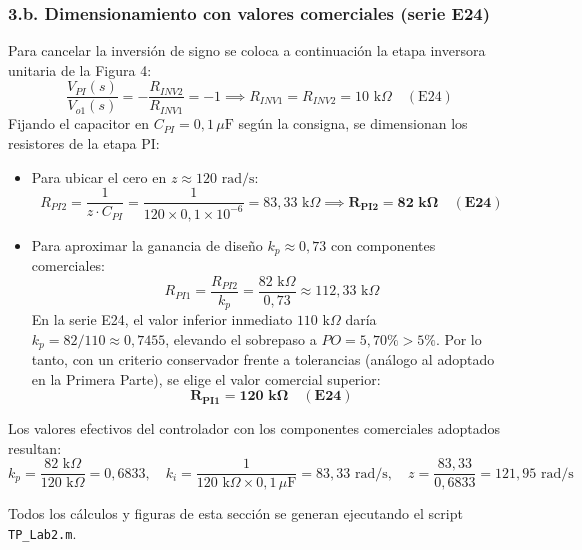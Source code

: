 \documentclass[11pt,a4paper]{article}
\begin{document}
\subsubsection*{3.b. Dimensionamiento con valores comerciales (serie E24)}
Para cancelar la inversión de signo se coloca a continuación la etapa inversora unitaria de la Figura 4:
\begin{equation}
    \frac{V_{PI}(s)}{V_{o1}(s)} = -\frac{R_{INV2}}{R_{INV1}} = -1 \implies R_{INV1} = R_{INV2} = 10\text{ k}\Omega \quad (\text{E24})
\end{equation}
Fijando el capacitor en $C_{PI} = 0{,}1\,\mu\text{F}$ según la consigna, se dimensionan los resistores de la etapa PI:
\begin{itemize}
    \item Para ubicar el cero en $z \approx 120\text{ rad/s}$:
    \begin{equation}
        R_{PI2} = \frac{1}{z \cdot C_{PI}} = \frac{1}{120 \times 0{,}1\times 10^{-6}} = 83{,}33\text{ k}\Omega \implies \mathbf{R_{PI2} = 82\text{ k}\Omega \quad (\text{E24})}
    \end{equation}
    \item Para aproximar la ganancia de diseño $k_p \approx 0{,}73$ con componentes comerciales:
    \begin{equation}
        R_{PI1} = \frac{R_{PI2}}{k_p} = \frac{82\text{ k}\Omega}{0{,}73} \approx 112{,}33\text{ k}\Omega
    \end{equation}
    En la serie E24, el valor inferior inmediato $110\text{ k}\Omega$ daría $k_p = 82/110 \approx 0{,}7455$, elevando el sobrepaso a $PO = 5{,}70\% > 5\%$. Por lo tanto, con un criterio conservador frente a tolerancias (análogo al adoptado en la Primera Parte), se elige el valor comercial superior:
    \begin{equation}
        \mathbf{R_{PI1} = 120\text{ k}\Omega \quad (\text{E24})}
    \end{equation}
\end{itemize}

Los valores efectivos del controlador con los componentes comerciales adoptados resultan:
\begin{equation}
    k_p = \frac{82\text{ k}\Omega}{120\text{ k}\Omega} = 0{,}6833, \quad k_i = \frac{1}{120\text{ k}\Omega \times 0{,}1\,\mu\text{F}} = 83{,}33\text{ rad/s}, \quad z = \frac{83{,}33}{0{,}6833} = 121{,}95\text{ rad/s}
\end{equation}


Todos los cálculos y figuras de esta sección se generan ejecutando el script \texttt{TP\_Lab2.m}.
\end{document}
